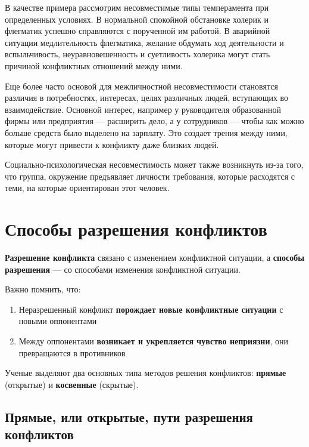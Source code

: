 \documentclass[a4paper,14pt]{extarticle}
\begin{document}
В качестве примера рассмотрим несовместимые типы темперамента при определенных условиях. В нормальной спокойной    обстановке холерик и флегматик успешно справляются с порученной им работой. В аварийной ситуации медлительность флегматика, желание обдумать ход деятельности и вспыльчивость, неуравновешенность и суетливость холерика могут стать причиной конфликтных отношений между ними.

Еще более часто основой для межличностной несовместимости становятся различия в потребностях, интересах, целях  различных людей, вступающих во взаимодействие. Основной интерес, например у руководителя образованной фирмы или предприятия — расширить дело, а у сотрудников  — чтобы как можно больше средств было выделено на зарплату. Это создает трения между ними, которые могут привести к конфликту даже близких людей.

Социально-психологическая несовместимость может также возникнуть из-за того, что группа, окружение предъявляет личности требования, которые расходятся с теми, на которые ориентирован этот человек.

\pagebreak
\section{Способы разрешения конфликтов}

\textbf{Разрешение конфликта} связано с изменением конфликтной ситуации, а \textbf{способы разрешения} — со способами изменения конфликтной ситуации.

Важно помнить, что:

\begin{enumerate}
    \item Неразрешенный конфликт \textbf{порождает новые конфликтные ситуации} с новыми оппонентами
    \item Между оппонентами \textbf{возникает и укрепляется чувство неприязни}, они превращаются в противников
\end{enumerate}

Ученые выделяют два основных типа методов решения конфликтов: \textbf{прямые} (открытые) и \textbf{косвенные} (скрытые).

\subsection{Прямые, или открытые, пути разрешения конфликтов}
\end{document}
